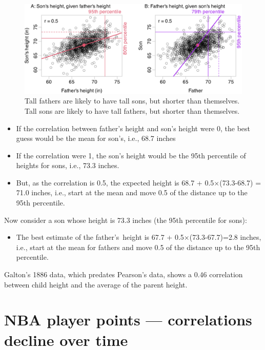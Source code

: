 \documentclass[
  10pt,
  b5paper]{book}
\providecommand{\tightlist}{%
  \setlength{\itemsep}{0pt}\setlength{\parskip}{0pt}}
\begin{document}
\begin{figure}[H]

{\centering \includegraphics[width=1\linewidth]{07-regress_files/figure-latex/pearson-1} 

}

\caption{Tall fathers are likely to have tall sons, but shorter than themselves. 
Tall sons are likely to have tall fathers, but shorter than themselves.}\label{fig:pearson}
\end{figure}

\begin{itemize}
\tightlist
\item
  If the correlation between father's height and son's height were 0,
  the best guess would be the mean for son's, i.e., 68.7 inches
\item
  If the correlation were 1, the son's height would be the
  95th percentile of heights for sons, i.e., 73.3 inches.
\item
  But, as the correlation is 0.5, the expected height is
  68.7 + 0.5\(\times\)(73.3-68.7) = 71.0 inches, i.e., start at
  the mean and move 0.5 of the distance up to the 95th percentile.
\end{itemize}

Now consider a son whose height is 73.3 inches (the 95th percentile for
sons):

\begin{itemize}
\tightlist
\item
  The best estimate of the father's~height is 67.7 +
  0.5\(\times\)(73.3-67.7)=2.8 inches, i.e., start at the mean
  for fathers and move 0.5 of the distance up to the 95th percentile.
\end{itemize}

Galton's 1886 data, which predates Pearson's data, shows a 0.46
correlation between child height and the average of the parent
height.

\hypertarget{nba-player-points-correlations-decline-over-time}{%
\section{NBA player points --- correlations decline over time}\label{nba-player-points-correlations-decline-over-time}}
\end{document}
